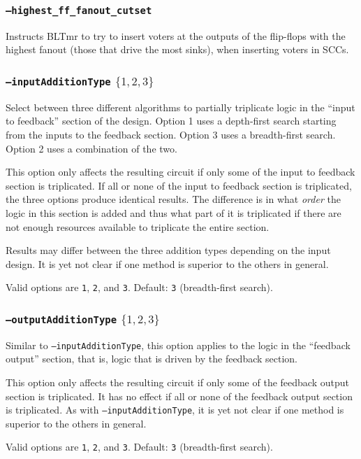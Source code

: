 \documentclass[english]{article}
\begin{document}
\subsubsection{\texttt{--highest\_ff\_fanout\_cutset}}
Instructs BLTmr to try to insert voters at the outputs of the flip-flops with 
the highest fanout (those that drive the most sinks), when inserting voters 
in SCCs.

\subsubsection{\texttt{--inputAdditionType} $\{1,2,3\}$}
Select between three different algorithms to partially triplicate logic in the 
``input to feedback'' section of the design. Option 1 uses a depth-first search 
starting from the inputs to the feedback section. Option 3 uses a breadth-first 
search. Option 2 uses a combination of the two.

This option only affects the resulting circuit if only some of the input
to feedback section is triplicated. If all or none of the input to feedback 
section is triplicated, the three options produce identical results. The 
difference is in what \emph{order} the logic in this section is added and thus 
what part of it is triplicated if there are not enough resources available to 
triplicate the entire section.

Results may differ between the three addition types depending on the input 
design. It is yet not clear if one method is superior to the others in general. 

Valid options are \texttt{1}, \texttt{2}, and \texttt{3}. Default: \texttt{3} 
(breadth-first search).

\subsubsection{\texttt{--outputAdditionType} $\{1,2,3\}$}
Similar to \texttt{--inputAdditionType}, this option applies to the logic 
in the ``feedback output'' section, that is, logic that is driven by the
feedback section.

This option only affects the resulting circuit if only some of the feedback 
output section is triplicated. It has no effect if all or none of the feedback 
output section is triplicated. As with \texttt{--inputAdditionType}, it is yet
not clear if one method is superior to the others in general.

Valid options are \texttt{1}, \texttt{2}, and \texttt{3}. Default: \texttt{3} 
(breadth-first search).
\end{document}
